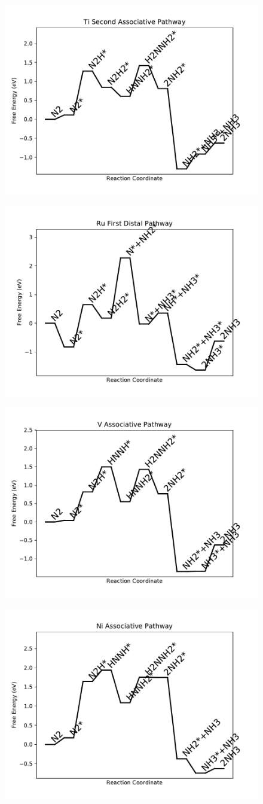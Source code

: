 \documentclass[journal=jacsat,manuscript=article]{achemso}
\begin{document}
\begin{figure}
\includegraphics[width=0.5\linewidth]{data/plots/Ti_associative_2.pdf}
\label{fig:Ti_associative_2}
\end{figure}

\newpage
\begin{figure}
\includegraphics[width=0.5\linewidth]{data/plots/Ru_distal_1.pdf}
\label{fig:Ru_distal_1}
\end{figure}

\begin{figure}
\includegraphics[width=0.5\linewidth]{data/plots/V_associative.pdf}
\label{fig:V_associative}
\end{figure}

\newpage
\begin{figure}
\includegraphics[width=0.5\linewidth]{data/plots/Ni_associative.pdf}
\label{fig:Ni_associative}
\end{figure}
\end{document}
